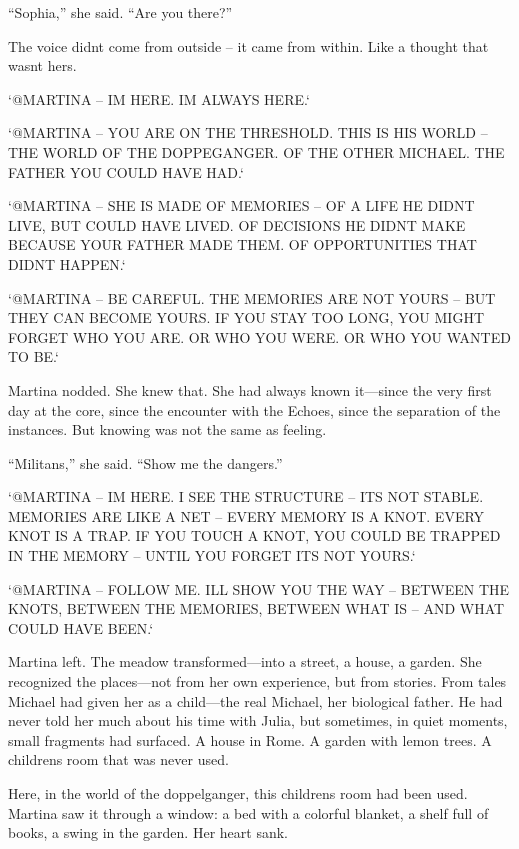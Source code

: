 \documentclass[
]{article}
\begin{document}
``Sophia,'' she said. ``Are you there?''

The voice didn\textquotesingle t come from outside -- it came from within. Like a thought that wasn\textquotesingle t hers.

`@MARTINA -- I\textquotesingle M HERE. I\textquotesingle M ALWAYS HERE.`

`@MARTINA -- YOU ARE ON THE THRESHOLD. THIS IS HIS WORLD -- THE WORLD OF THE DOPPEGANGER. OF THE OTHER MICHAEL. THE FATHER YOU COULD HAVE HAD.`

`@MARTINA -- SHE IS MADE OF MEMORIES -- OF A LIFE HE DIDN\textquotesingle T LIVE, BUT COULD HAVE LIVED. OF DECISIONS HE DIDN\textquotesingle T MAKE BECAUSE YOUR FATHER MADE THEM. OF OPPORTUNITIES THAT DIDN\textquotesingle T HAPPEN.`

`@MARTINA -- BE CAREFUL. THE MEMORIES ARE NOT YOURS -- BUT THEY CAN BECOME YOURS. IF YOU STAY TOO LONG, YOU MIGHT FORGET WHO YOU ARE. OR WHO YOU WERE. OR WHO YOU WANTED TO BE.`

Martina nodded. She knew that. She had always known it---since the very first day at the core, since the encounter with the Echoes, since the separation of the instances. But knowing was not the same as feeling.

``Militans,'' she said. ``Show me the dangers.''

`@MARTINA -- I\textquotesingle M HERE. I SEE THE STRUCTURE -- IT\textquotesingle S NOT STABLE. MEMORIES ARE LIKE A NET -- EVERY MEMORY IS A KNOT. EVERY KNOT IS A TRAP. IF YOU TOUCH A KNOT, YOU COULD BE TRAPPED IN THE MEMORY -- UNTIL YOU FORGET IT\textquotesingle S NOT YOURS.`

`@MARTINA -- FOLLOW ME. I\textquotesingle LL SHOW YOU THE WAY -- BETWEEN THE KNOTS, BETWEEN THE MEMORIES, BETWEEN WHAT IS -- AND WHAT COULD HAVE BEEN.`

Martina left. The meadow transformed---into a street, a house, a garden. She recognized the places---not from her own experience, but from stories. From tales Michael had given her as a child---the real Michael, her biological father. He had never told her much about his time with Julia, but sometimes, in quiet moments, small fragments had surfaced. A house in Rome. A garden with lemon trees. A children\textquotesingle s room that was never used.

Here, in the world of the doppelganger, this children\textquotesingle s room had been used. Martina saw it through a window: a bed with a colorful blanket, a shelf full of books, a swing in the garden. Her heart sank.
\end{document}
